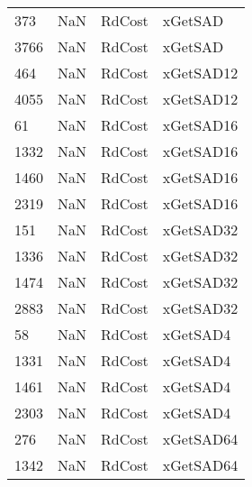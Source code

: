 \begin{tabular}{llll}
373  &                   NaN &                     RdCost &                                   xGetSAD \\
3766 &                   NaN &                     RdCost &                                   xGetSAD \\
464  &                   NaN &                     RdCost &                                 xGetSAD12 \\
4055 &                   NaN &                     RdCost &                                 xGetSAD12 \\
61   &                   NaN &                     RdCost &                                 xGetSAD16 \\
1332 &                   NaN &                     RdCost &                                 xGetSAD16 \\
1460 &                   NaN &                     RdCost &                                 xGetSAD16 \\
2319 &                   NaN &                     RdCost &                                 xGetSAD16 \\
151  &                   NaN &                     RdCost &                                 xGetSAD32 \\
1336 &                   NaN &                     RdCost &                                 xGetSAD32 \\
1474 &                   NaN &                     RdCost &                                 xGetSAD32 \\
2883 &                   NaN &                     RdCost &                                 xGetSAD32 \\
58   &                   NaN &                     RdCost &                                  xGetSAD4 \\
1331 &                   NaN &                     RdCost &                                  xGetSAD4 \\
1461 &                   NaN &                     RdCost &                                  xGetSAD4 \\
2303 &                   NaN &                     RdCost &                                  xGetSAD4 \\
276  &                   NaN &                     RdCost &                                 xGetSAD64 \\
1342 &                   NaN &                     RdCost &                                 xGetSAD64 \\

\end{tabular}
